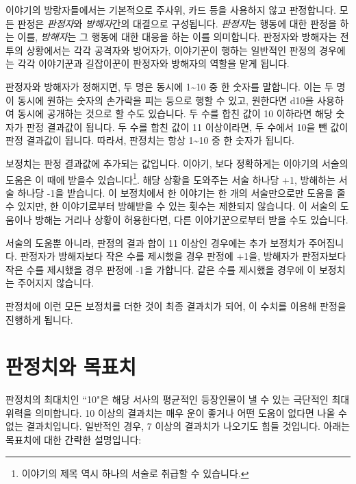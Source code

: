 \documentclass{report}
\begin{document}
	이야기의 방랑자들에서는 기본적으로 주사위, 카드 등을 사용하지 않고 판정합니다. 모든 판정은 \emph{판정자}와 \emph{방해자}간의 대결으로 구성됩니다. \emph{판정자}는 행동에 대한 판정을 하는 이를, \emph{방해자}는 그 행동에 대한 대응을 하는 이를 의미합니다. 판정자와 방해자는 전투의 상황에서는 각각 공격자와 방어자가, 이야기꾼이 행하는 일반적인 판정의 경우에는 각각 이야기꾼과 길잡이꾼이 판정자와 방해자의 역할을 맡게 됩니다.
	
	판정자와 방해자가 정해지면, 두 명은 동시에 1\textasciitilde10 중 한 숫자를 말합니다. 이는 두 명이 동시에 원하는 숫자의 손가락을 피는 등으로 행할 수 있고, 원한다면 d10을 사용하여 동시에 공개하는 것으로 할 수도 있습니다. 두 수를 합친 값이 10 이하라면 해당 숫자가 판정 결과값이 됩니다. 두 수를 합친 값이 11 이상이라면, 두 수에서 10을 뺀 값이 판정 결과값이 됩니다. 따라서, 판정치는 항상 1\textasciitilde10 중 한 숫자가 됩니다.
	
	보정치는 판정 결과값에 추가되는 값입니다. 이야기, 보다 정확하게는 이야기의 서술의 도움은 이 때에 받을수 있습니다\footnote{이야기의 제목 역시 하나의 서술로 취급할 수 있습니다.}. 해당 상황을 도와주는 서술 하나당 +1, 방해하는 서술 하나당 -1을 받습니다. 이 보정치에서 한 이야기는 한 개의 서술만으로만 도움을 줄 수 있지만, 한 이야기로부터 방해받을 수 있는 횟수는 제한되지 않습니다. 이 서술의 도움이나 방해는 거리나 상황이 허용한다면, 다른 이야기꾼으로부터 받을 수도 있습니다.
	
	서술의 도움뿐 아니라, 판정의 결과 합이 11 이상인 경우에는 추가 보정치가 주어집니다. 판정자가 방해자보다 작은 수를 제시했을 경우 판정에 +1을, 방해자가 판정자보다 작은 수를 제시했을 경우 판정에 -1을 가합니다. 같은 수를 제시했을 경우에 이 보정치는 주어지지 않습니다.
	
	판정치에 이런 모든 보정치를 더한 것이 최종 결과치가 되어, 이 수치를 이용해 판정을 진행하게 됩니다.
	
	\section*{판정치와 목표치}
	판정치의 최대치인 ``10"은 해당 서사의 평균적인 등장인물이 낼 수 있는 극단적인 최대 위력을 의미합니다. 10 이상의 결과치는 매우 운이 좋거나 어떤 도움이 없다면 나올 수 없는 결과치입니다. 일반적인 경우, 7 이상의 결과치가 나오기도 힘들 것입니다. 아래는 목표치에 대한 간략한 설명입니다:
	
\end{document}
